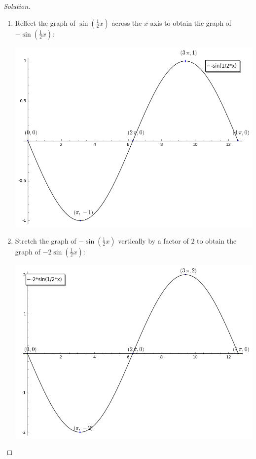 \documentclass[12pt]{amsart}
\begin{document}
\begin{thm}[20 Points]
\begin{proof}[Solution]
\begin{enumerate}
\begin{center}
      \end{center}
    \item
      Reflect the graph of $\sin\left(\frac{1}{2}x\right)$ across the $x$-axis to obtain the graph of $-\sin\left(\frac{1}{2}x\right)$:
      \begin{center}
        \includegraphics[scale=0.5]{sin/p_2}
      \end{center}
    \item
      Stretch the graph of $-\sin\left(\frac{1}{2}x\right)$ vertically by a factor of $2$ to obtain the graph of $-2\sin\left(\frac{1}{2}x\right)$:
      \begin{center}
        \includegraphics[scale=0.5]{sin/p_3}
      \end{center}

\end{enumerate}
\end{proof}
\end{thm}
\end{document}
